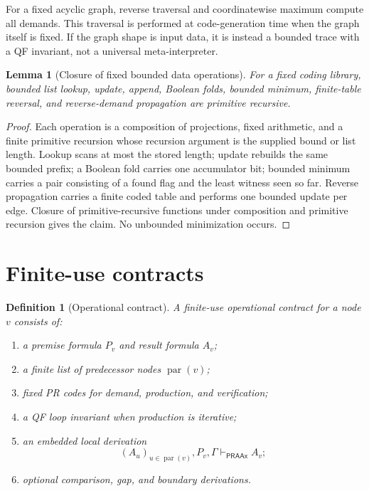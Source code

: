 \documentclass[11pt]{article}
\newtheorem{lemma}[theorem]{Lemma}
\newtheorem{definition}[theorem]{Definition}
\newcommand{\PRAAx}{\mathsf{PRAAx}}
\begin{document}
For a fixed acyclic graph, reverse traversal and coordinatewise maximum compute
all demands.  This traversal is performed at code-generation time when the
graph itself is fixed.  If the graph shape is input data, it is instead a
bounded trace with a QF invariant, not a universal meta-interpreter.

\begin{lemma}[Closure of fixed bounded data operations]
For a fixed coding library, bounded list lookup, update, append, Boolean folds,
bounded minimum, finite-table reversal, and reverse-demand propagation are
primitive recursive.
\end{lemma}

\begin{proof}
Each operation is a composition of projections, fixed arithmetic, and a finite
primitive recursion whose recursion argument is the supplied bound or list
length.  Lookup scans at most the stored length; update rebuilds the same
bounded prefix; a Boolean fold carries one accumulator bit; bounded minimum
carries a pair consisting of a found flag and the least witness seen so far.
Reverse propagation carries a finite coded table and performs one bounded
update per edge.  Closure of primitive-recursive functions under composition
and primitive recursion gives the claim.  No unbounded minimization occurs.
\end{proof}

\section{Finite-use contracts}

\begin{definition}[Operational contract]
A finite-use operational contract for a node \(v\) consists of:
\begin{enumerate}
\item a premise formula \(P_v\) and result formula \(A_v\);
\item a finite list of predecessor nodes \(\operatorname{par}(v)\);
\item fixed PR codes for demand, production, and verification;
\item a QF loop invariant when production is iterative;
\item an embedded local derivation
\[
  (A_u)_{u\in\operatorname{par}(v)},P_v,\Gamma
  \vdash_{\PRAAx} A_v;
\]
\item optional comparison, gap, and boundary derivations.
\end{enumerate}
\end{definition}
\end{document}
